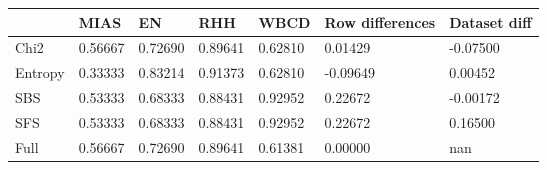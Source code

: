 \begin{tabular}{|l|l|l|l|l|l|l|}
\toprule
{} &    MIAS &      EN &     RHH &    WBCD & Row differences & Dataset diff \\
\midrule
Chi2    & 0.56667 & 0.72690 & 0.89641 & 0.62810 &         0.01429 &     -0.07500 \\
Entropy & 0.33333 & 0.83214 & 0.91373 & 0.62810 &        -0.09649 &      0.00452 \\
SBS     & 0.53333 & 0.68333 & 0.88431 & 0.92952 &         0.22672 &     -0.00172 \\
SFS     & 0.53333 & 0.68333 & 0.88431 & 0.92952 &         0.22672 &      0.16500 \\
Full    & 0.56667 & 0.72690 & 0.89641 & 0.61381 &         0.00000 &          nan \\
\bottomrule
\end{tabular}
